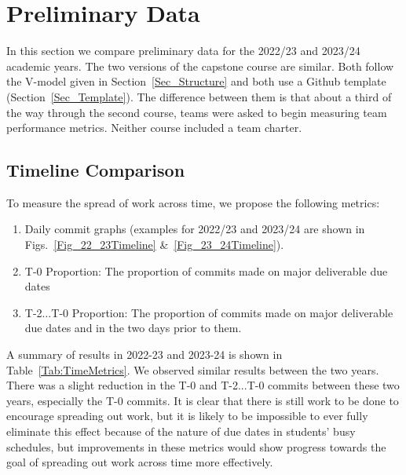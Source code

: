 \documentclass[10pt, conference]{IEEEtran}
\begin{document}
\section{Preliminary Data} \label{SecPrelimData}

In this section we compare preliminary data for the 2022/23 and 2023/24 academic
years.  The two versions of the capstone course are similar.  Both follow the
V-model given in Section~\ref{Sec_Structure} and both use a Github template
(Section~\ref{Sec_Template}). The difference between them is that about a third
of the way through the second course, teams were asked to begin measuring team
performance metrics.  Neither course included a team charter.

\subsection{Timeline Comparison}

To measure the spread of work across time, we propose the following
metrics:

\begin{enumerate}
\item Daily commit graphs (examples for 2022/23 and 2023/24 are shown in
Figs.~\ref{Fig_22_23Timeline} \&~\ref{Fig_23_24Timeline}).
\item T-0 Proportion: The proportion of commits made on major deliverable due dates
\item T-2$\ldots$T-0 Proportion: The proportion of commits made on major deliverable due
      dates and in the two days prior to them.
\end{enumerate}

A summary of results in 2022-23 and 2023-24 is shown in Table~\ref{Tab:TimeMetrics}.
We observed similar results between the two years. There was a slight reduction in the 
T-0 and T-2...T-0 commits between these two
years, especially the T-0 commits. It is clear that there is still work to be done to
encourage spreading out work, but it is likely to be impossible to ever fully eliminate
this effect because of the nature of due dates in students' busy schedules, but
improvements in these metrics would show progress towards the goal of spreading out
work across time more effectively.
\end{document}
